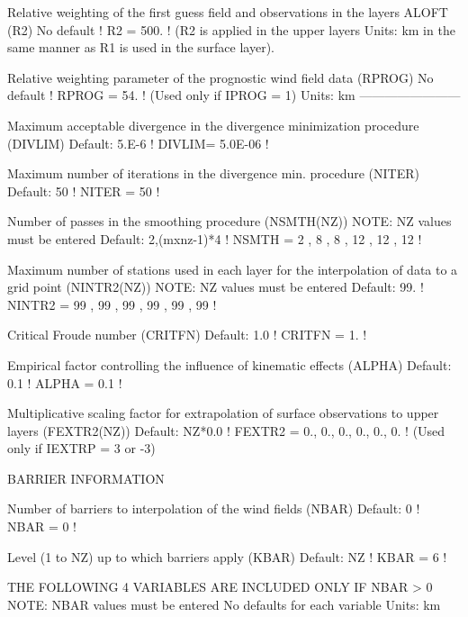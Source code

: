\documentclass[a4paper,10pt]{article}
\begin{document}
       Relative weighting of the first
       guess field and observations in the
       layers ALOFT (R2)                     No default      ! R2 = 500. !
       (R2 is applied in the upper layers    Units: km
       in the same manner as R1 is used in
       the surface layer).

       Relative weighting parameter of the
       prognostic wind field data (RPROG)    No default      ! RPROG = 54. !
       (Used only if IPROG = 1)              Units: km
       ------------------------

       Maximum acceptable divergence in the
       divergence minimization procedure
       (DIVLIM)                              Default: 5.E-6  ! DIVLIM= 5.0E-06 !

       Maximum number of iterations in the
       divergence min. procedure (NITER)     Default: 50     ! NITER =  50  !

       Number of passes in the smoothing
       procedure (NSMTH(NZ))
       NOTE: NZ values must be entered
            Default: 2,(mxnz-1)*4 ! NSMTH = 
 2 ,  8 ,  8 ,  12 ,  12 ,  12  !

       Maximum number of stations used in
       each layer for the interpolation of
       data to a grid point (NINTR2(NZ))
       NOTE: NZ values must be entered       Default: 99.    ! NINTR2 = 
 99 ,  99 ,  99 ,  99 ,  99 ,  99  !

       Critical Froude number (CRITFN)       Default: 1.0    ! CRITFN = 1. !

       Empirical factor controlling the
       influence of kinematic effects
       (ALPHA)                               Default: 0.1    ! ALPHA = 0.1 !

       Multiplicative scaling factor for
       extrapolation of surface observations
       to upper layers (FEXTR2(NZ))          Default: NZ*0.0 
       ! FEXTR2 = 0., 0., 0., 0., 0., 0. !
       (Used only if IEXTRP = 3 or -3)


    BARRIER INFORMATION

       Number of barriers to interpolation
       of the wind fields (NBAR)             Default: 0      ! NBAR =  0  !

       Level (1 to NZ) up to which barriers
       apply (KBAR)                          Default: NZ     ! KBAR =  6  !

       THE FOLLOWING 4 VARIABLES ARE INCLUDED
       ONLY IF NBAR > 0
       NOTE: NBAR values must be entered     No defaults
             for each variable               Units: km
\end{document}
